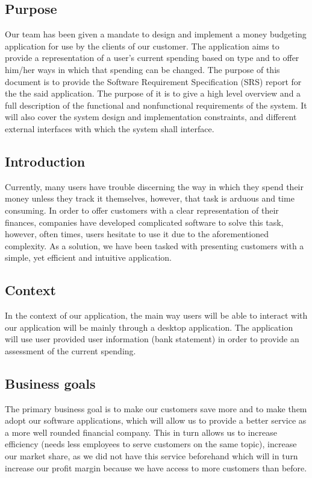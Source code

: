 \documentclass[letterpaper]{article}
\begin{document}
    \subsection{Purpose}
		Our team has been given a mandate to design and implement a money budgeting application for use by the clients of our customer. The application aims to provide a representation of a user's current spending based on type and to offer him/her ways in which that spending can be changed. The purpose of this document is to provide the Software Requirement Specification (SRS) report for the the said application. The purpose of it is to give a high level overview and a full description of the functional and nonfunctional requirements of the system. It will also cover the system design and implementation constraints, and different external interfaces with which the system shall interface.
		
	\subsection{Introduction}
	
		Currently, many users have trouble discerning the way in which they spend their money unless they track it themselves, however, that task is arduous and time consuming. In order to offer customers with a clear representation of their finances, companies have developed complicated software to solve this task, however, often times, users hesitate to use it due to the aforementioned complexity. As a solution, we have been tasked with presenting customers with a simple, yet efficient and intuitive application.
	
	\subsection{Context}
	
		In the context of our application, the main way users will be able to interact with our application will be mainly through a desktop application. The application will use user provided user information (bank statement) in order to provide an assessment of the current spending.
	
	\subsection{Business goals}
	
		The primary business goal is to make our customers save more and to make them adopt our software applications, which will allow us to provide a better service as a more well rounded financial company. This in turn allows us to increase efficiency (needs less employees to serve customers on the same topic), increase our market share, as we did not have this service beforehand which will in turn increase our profit margin because we have access to more customers than before.
	
\end{document}
